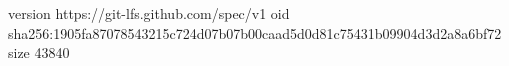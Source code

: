 version https://git-lfs.github.com/spec/v1
oid sha256:1905fa87078543215c724d07b07b00caad5d0d81c75431b09904d3d2a8a6bf72
size 43840
